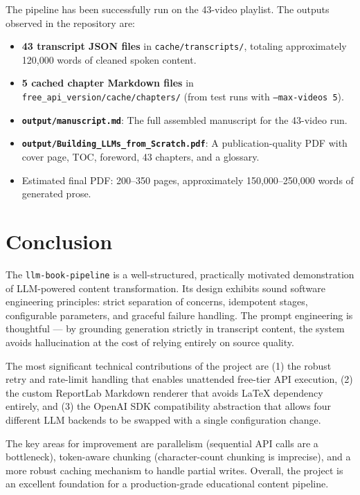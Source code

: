 \documentclass[11pt,a4paper]{article}
\begin{document}
The pipeline has been successfully run on the 43-video playlist. The outputs observed in the repository are:

\begin{itemize}[leftmargin=1.5em]
    \item \textbf{43 transcript JSON files} in \texttt{cache/transcripts/}, totaling approximately 120,000 words of cleaned spoken content.
    \item \textbf{5 cached chapter Markdown files} in \texttt{free\_api\_version/cache/chapters/} (from test runs with \texttt{--max-videos 5}).
    \item \textbf{\texttt{output/manuscript.md}}: The full assembled manuscript for the 43-video run.
    \item \textbf{\texttt{output/Building\_LLMs\_from\_Scratch.pdf}}: A publication-quality PDF with cover page, TOC, foreword, 43 chapters, and a glossary.
    \item Estimated final PDF: 200--350 pages, approximately 150,000--250,000 words of generated prose.
\end{itemize}

\section{Conclusion}

The \texttt{llm-book-pipeline} is a well-structured, practically motivated demonstration of LLM-powered content transformation. Its design exhibits sound software engineering principles: strict separation of concerns, idempotent stages, configurable parameters, and graceful failure handling. The prompt engineering is thoughtful --- by grounding generation strictly in transcript content, the system avoids hallucination at the cost of relying entirely on source quality.

The most significant technical contributions of the project are (1) the robust retry and rate-limit handling that enables unattended free-tier API execution, (2) the custom ReportLab Markdown renderer that avoids LaTeX dependency entirely, and (3) the OpenAI SDK compatibility abstraction that allows four different LLM backends to be swapped with a single configuration change.

The key areas for improvement are parallelism (sequential API calls are a bottleneck), token-aware chunking (character-count chunking is imprecise), and a more robust caching mechanism to handle partial writes. Overall, the project is an excellent foundation for a production-grade educational content pipeline.
\end{document}

